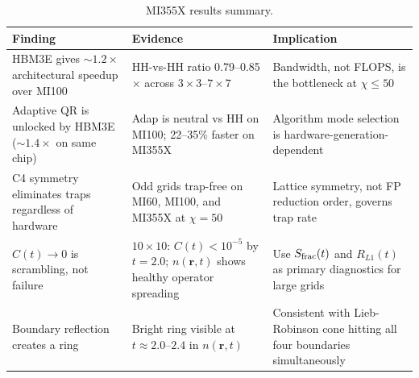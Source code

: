 \begin{table}[ht]
\centering
\caption{MI355X results summary.}
\label{tab:mi355x_summary}
\smallskip
\small
\begin{tabular}{p{3.8cm} p{4.0cm} p{4.4cm}}
\toprule
\textbf{Finding} & \textbf{Evidence} & \textbf{Implication} \\
\midrule
HBM3E gives ${\sim}1.2\times$ architectural speedup over MI100
  & HH-vs-HH ratio 0.79--0.85$\times$ across $3\times3$--$7\times7$
  & Bandwidth, not FLOPS, is the bottleneck at $\chi \leq 50$ \\[4pt]

Adaptive QR is unlocked by HBM3E (${\sim}1.4\times$ on same chip)
  & Adap is neutral vs HH on MI100; 22--35\% faster on MI355X
  & Algorithm mode selection is hardware-generation-dependent \\[4pt]

C4 symmetry eliminates traps regardless of hardware
  & Odd grids trap-free on MI60, MI100, and MI355X at $\chi=50$
  & Lattice symmetry, not FP reduction order, governs trap rate \\[4pt]

$C(t)\to 0$ is scrambling, not failure
  & $10\times10$: $C(t) < 10^{-5}$ by $t=2.0$; $n(\mathbf{r},t)$ shows
    healthy operator spreading
  & Use $S_{\rm frac}(t)$ and $R_{L1}(t)$ as primary diagnostics for large grids \\[4pt]

Boundary reflection creates a ring
  & Bright ring visible at $t \approx 2.0$--$2.4$ in $n(\mathbf{r},t)$
  & Consistent with Lieb-Robinson cone hitting all four boundaries simultaneously \\
\bottomrule
\end{tabular}
\end{table}

